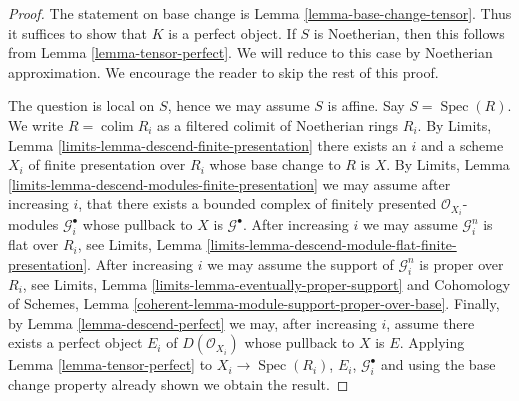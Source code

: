 \documentclass{stacks-project}
\theoremstyle{plain}
\theoremstyle{definition}
\theoremstyle{remark}
\numberwithin{equation}{subsection}
\def\colim{\mathop{\mathrm{colim}}\nolimits}
\def\Spec{\mathop{\mathrm{Spec}}}
\begin{document}
\begin{proof}
The statement on base change is Lemma \ref{lemma-base-change-tensor}.
Thus it suffices to show that $K$ is a perfect object. If $S$ is
Noetherian, then this follows from
Lemma \ref{lemma-tensor-perfect}.
We will reduce to this case by Noetherian approximation.
We encourage the reader to skip the rest of this proof.

\medskip\noindent
The question is local on $S$, hence we may assume $S$ is affine.
Say $S = \Spec(R)$. We write $R = \colim R_i$ as a filtered colimit
of Noetherian rings $R_i$. By Limits, Lemma
\ref{limits-lemma-descend-finite-presentation}
there exists an $i$ and a scheme $X_i$ of finite presentation over $R_i$
whose base change to $R$ is $X$. By
Limits, Lemma \ref{limits-lemma-descend-modules-finite-presentation}
we may assume after increasing $i$, that there exists a bounded
complex of finitely presented $\mathcal{O}_{X_i}$-modules
$\mathcal{G}_i^\bullet$ whose pullback to $X$ is $\mathcal{G}^\bullet$.
After increasing $i$ we may assume $\mathcal{G}_i^n$ is flat over $R_i$, see
Limits, Lemma \ref{limits-lemma-descend-module-flat-finite-presentation}.
After increasing $i$ we may assume the support of $\mathcal{G}_i^n$
is proper over $R_i$, see
Limits, Lemma \ref{limits-lemma-eventually-proper-support}
and Cohomology of Schemes, Lemma
\ref{coherent-lemma-module-support-proper-over-base}.
Finally, by Lemma \ref{lemma-descend-perfect}
we may, after increasing $i$, assume there exists a perfect
object $E_i$ of $D(\mathcal{O}_{X_i})$ whose pullback to
$X$ is $E$. Applying Lemma \ref{lemma-tensor-perfect}
to $X_i \to \Spec(R_i)$, $E_i$, $\mathcal{G}_i^\bullet$ and using the
base change property already shown we obtain the result.
\end{proof}
\end{document}
